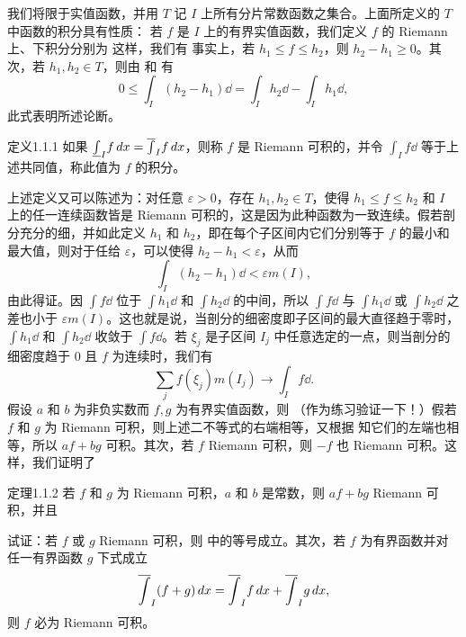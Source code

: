 我们将限于实值函数，并用 $T$ 记 $I$ 上所有分片常数函数之集合。上面所定义的 $T$ 中函数的积分具有性质：
若 $f$ 是 $I$ 上的有界实值函数，我们定义 $f$ 的 Riemann 上、下积分分别为
这样，我们有
事实上，若 $h_1\le f\le h_2$，则 $h_2-h_1\ge0$。其次，若 $h_1,h_2\in T$，则由  和  有
\[0\le\int_I(h_2-h_1)\dd=\int_I h_2\dd-\int_I h_1\dd,\]
此式表明所述论断。
\begin{statement}{定义}{1.1.1}
如果 $\underline{\int}_I f\,dx=\overline{\int}_I f\,dx$，则称 $f$ 是 Riemann 可积的，并令 $\int_I f\dd$ 等于上述共同值，称此值为 $f$ 的积分。
\end{statement}
上述定义又可以陈述为：对任意 $\varepsilon>0$，存在 $h_1,h_2\in T$，使得 $h_1\le f\le h_2$ 和
$I$ 上的任一连续函数皆是 Riemann 可积的，这是因为此种函数为一致连续。假若剖分充分的细，并如此定义 $h_1$ 和 $h_2$，即在每个子区间内它们分别等于 $f$ 的最小和最大值，则对于任给 $\varepsilon$，可以使得 $h_2-h_1<\varepsilon$，从而
\[\int_I(h_2-h_1)\dd<\varepsilon m(I),\]
 由此得证。因 $\int f\dd$ 位于 $\int h_1\dd$ 和 $\int h_2\dd$ 的中间，所以 $\int f\dd$ 与 $\int h_1\dd$ 或 $\int h_2\dd$ 之差也小于 $\varepsilon m(I)$。这也就是说，当剖分的细密度即子区间的最大直径趋于零时，$\int h_1\dd$ 和 $\int h_2\dd$ 收敛于
$\int f\dd$。若 $\xi_j$ 是子区间 $I_j$ 中任意选定的一点，则当剖分的细密度趋于 $0$ 且 $f$ 为连续时，我们有
\[\sum_j f(\xi_j)m(I_j)\longrightarrow\int_I f\dd.\]
假设 $a$ 和 $b$ 为非负实数而 $f,g$ 为有界实值函数，则
（作为练习验证一下！）假若 $f$ 和 $g$ 为 Riemann 可积，则上述二不等式的右端相等，又根据  知它们的左端也相等，所以 $af+bg$ 可积。其次，若 $f$ Riemann 可积，则 $-f$ 也 Riemann 可积。这样，我们证明了
\begin{statement}{定理}{1.1.2}
若 $f$ 和 $g$ 为 Riemann 可积，$a$ 和 $b$ 是常数，则 $af+bg$ Riemann 可积，并且
\end{statement}
\Exercise 试证：若 $f$ 或 $g$ Riemann 可积，则  中的等号成立。其次，若 $f$ 为有界函数并对任一有界函数 $g$ 下式成立
\[\overline{\int}_I(f+g)\,dx=\overline{\int}_I f\,dx+\overline{\int}_I g\,dx,\]
则 $f$ 必为 Riemann 可积。

